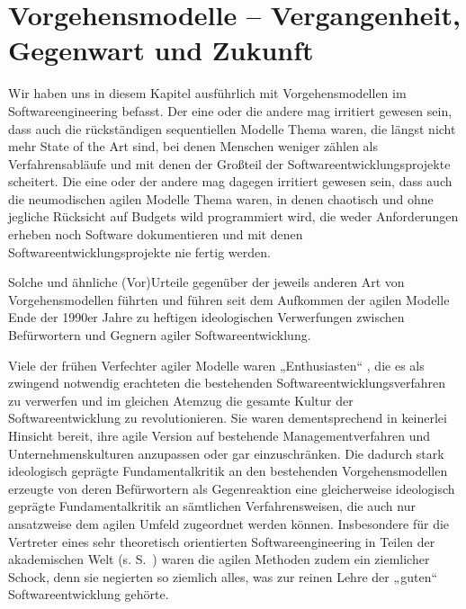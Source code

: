 \section{Vorgehensmodelle – Vergangenheit, Gegenwart und Zukunft}
\label{sec:Kap-2.3}

Wir haben uns 
in diesem Kapitel ausführlich mit Vorgehensmodellen im Softwareengineering befasst. Der eine oder die andere mag irritiert gewesen sein, dass auch die rückständigen sequentiellen Modelle Thema waren, die längst nicht mehr State of the Art sind, bei denen Menschen weniger zählen als Verfahrensabläufe und mit denen der Großteil der Softwareentwicklungsprojekte scheitert. Die eine oder der andere mag dagegen irritiert gewesen sein, dass auch die neumodischen agilen Modelle Thema waren, in denen chaotisch und ohne jegliche Rücksicht auf Budgets wild programmiert wird, die weder Anforderungen erheben noch Software dokumentieren und mit denen Softwareentwicklungsprojekte nie fertig werden.

\vspace{1mm} %

Solche und ähnliche (Vor)Urteile gegenüber der jeweils anderen Art von Vorgehensmodellen führten und führen seit dem Aufkommen der agilen Modelle Ende der 1990er Jahre zu heftigen ideologischen Verwerfungen zwischen Befürwortern und Gegnern agiler Softwareentwicklung. 

\vspace{1mm} %

Viele der frühen Verfechter agiler Modelle waren „Enthusiasten“ \cite[108]{som18}, die es als zwingend notwendig erachteten die bestehenden Software\-entwick\-lungs\-verfahren zu verwerfen und im gleichen Atemzug die gesamte Kultur der Soft\-ware\-entwick\-lung zu revolutionieren. Sie waren dementsprechend in keinerlei Hinsicht bereit, ihre agile Version auf bestehende Management\-verfahren und Unternehmens\-kulturen anzupassen oder gar einzuschränken. Die dadurch stark ideologisch geprägte Fundamentalkritik an den bestehenden Vorgehensmodellen erzeugte von deren Befürwortern als Gegenreaktion eine gleicherweise ideologisch geprägte Fundamentalkritik an sämtlichen Verfahrensweisen, die auch nur ansatzweise dem agilen Umfeld zugeordnet werden können. Insbesondere für die Vertreter eines sehr theoretisch orientierten Softwareengineering in Teilen der akademischen Welt (s. S.~\pageref{text:theoVertreter}) waren die agilen Methoden zudem ein ziemlicher Schock, denn sie negierten so ziemlich alles, was zur reinen Lehre der „guten“ Software\-entwicklung gehörte.

